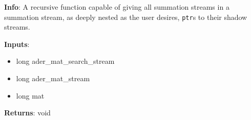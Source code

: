 \textbf{Info}: A recursive function capable of giving all summation streams
in a summation stream, as deeply nested as the user desires, \texttt{ptr}s to
their shadow streams.

\noindent \textbf{Inputs}:
\begin{itemize}
\item{long ader\_mat\_search\_stream}
\item{long ader\_mat\_stream}
\item{long mat}
\end{itemize}

\noindent \textbf{Returns}: void

